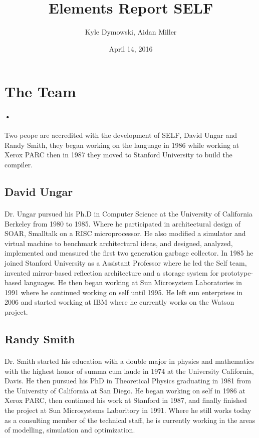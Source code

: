 \documentclass[12pt]{article}
\title{Elements Report SELF}
\author{Kyle Dymowski, Aidan Miller}
\date{April 14, 2016}
\begin{document}
\maketitle

\section{The Team}
\paragraph{•} Two peope are accredited with the development of SELF, David Ungar and Randy Smith, they began working on the language in 1986 while working at Xerox PARC then in 1987 they moved to Stanford University to build the compiler. 
\subsection{David Ungar}
\paragraph{} Dr. Ungar pursued his Ph.D in Computer Science at the University of California Berkeley from 1980 to 1985. Where he participated in architectural design of SOAR, Smalltalk on a RISC microprocessor. He also modified a simulator and virtual machine to benchmark architectural ideas, and designed, analyzed, implemented and measured the first two generation garbage collector. In 1985 he joined Stanford University as a Assistant Professor where he led the Self team, invented mirror-based reflection architecture and a storage system for prototype-based languages. He then began working at Sun Microsystem Laboratories in 1991 where he continued working on self until 1995. He left sun enterprises in 2006 and started working at IBM where he currently works on the Watson project. \cite{ungar}

\subsection{Randy Smith}
\paragraph{} Dr. Smith started his education with a double major in physics and mathematics with the highest honor of summa cum laude in 1974 at the University California, Davis. He then pursued his PhD in Theoretical Physics graduating in 1981 from the University of California at San Diego. He began working on self in 1986 at Xerox PARC, then continued his work at Stanford in 1987, and finally finished the project at Sun Microsystems Laboritory in 1991. Where he still works today as a consulting member of the technical staff, he is currently working in the areas of modelling, simulation and optimization. 
\end{document}
